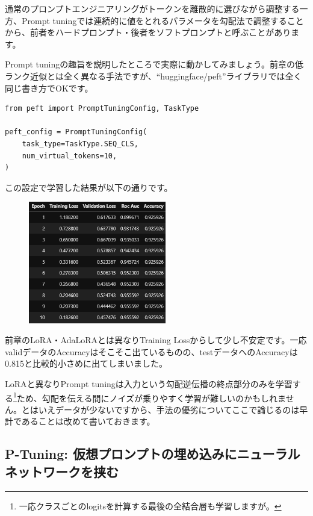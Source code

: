 \documentclass[a5paper,twoside,dvipdfmx]{jsarticle}
\begin{document}
 

通常のプロンプトエンジニアリングがトークンを離散的に選びながら調整する一方、Prompt tuningでは連続的に値をとれるパラメータを勾配法で調整することから、前者をハードプロンプト・後者をソフトプロンプトと呼ぶことがあります。

Prompt tuningの趣旨を説明したところで実際に動かしてみましょう。前章の低ランク近似とは全く異なる手法ですが、``huggingface/peft''ライブラリでは全く同じ書き方でOKです。

\begin{lstlisting}
from peft import PromptTuningConfig, TaskType

peft_config = PromptTuningConfig(
    task_type=TaskType.SEQ_CLS,
    num_virtual_tokens=10,
)
\end{lstlisting}

この設定で学習した結果が以下の通りです。


\begin{figure}[h]
  \centering
  \includegraphics[width=60mm]{../C105Fig/gray/prompttuning_train.png}
 \end{figure} 


前章のLoRA・AdaLoRAとは異なりTraining Lossからして少し不安定です。一応validデータのAccuracyはそこそこ出ているものの、testデータへのAccuracyは0.815と比較的小さめに出てしまいました。

LoRAと異なりPrompt tuningは入力という勾配逆伝播の終点部分のみを学習する\footnote{一応クラスごとのlogitsを計算する最後の全結合層も学習しますが。}ため、勾配を伝える間にノイズが乗りやすく学習が難しいのかもしれません。とはいえデータが少ないですから、手法の優劣についてここで論じるのは早計であることは改めて書いておきます。

\subsection{P-Tuning: 仮想プロンプトの埋め込みにニューラルネットワークを挟む}
\end{document}
